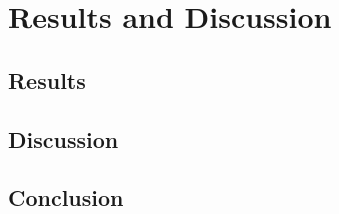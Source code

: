 \documentclass{kththesis}
\begin{document}
\chapter{Results and Discussion}

\section{Results}

\section{Discussion}

\section{Conclusion}

\printbibliography[heading=bibintoc]


\end{document}
